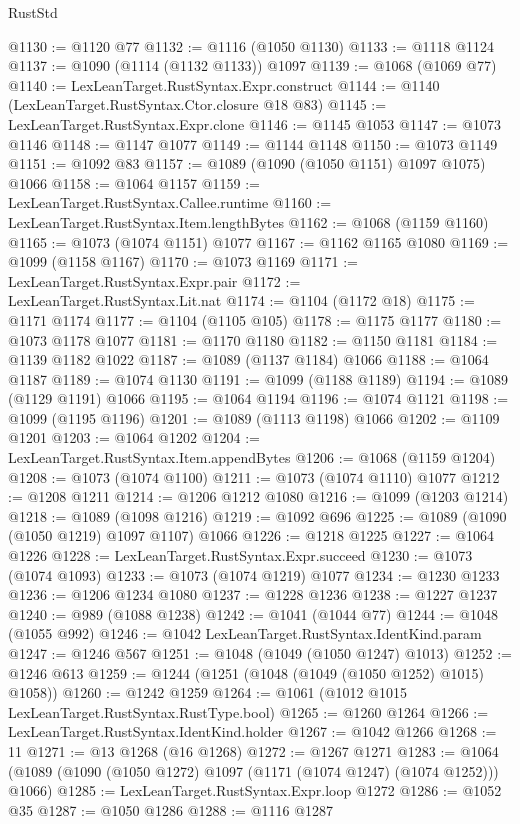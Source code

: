 \begin{lexlean}{RustStd}
\begin{coremodule}
{\begin{coremodule}
{{{{{{{{{{{{{{@1130 := @1120 @77
@1132 := @1116 (@1050 @1130)
@1133 := @1118 @1124
@1137 := @1090 (@1114 (@1132 @1133)) @1097
@1139 := @1068 (@1069 @77)
@1140 := LexLeanTarget.RustSyntax.Expr.construct
@1144 := @1140 (LexLeanTarget.RustSyntax.Ctor.closure @18 @83)
@1145 := LexLeanTarget.RustSyntax.Expr.clone
@1146 := @1145 @1053
@1147 := @1073 @1146
@1148 := @1147 @1077
@1149 := @1144 @1148
@1150 := @1073 @1149
@1151 := @1092 @83
@1157 := @1089 (@1090 (@1050 @1151) @1097 @1075) @1066
@1158 := @1064 @1157
@1159 := LexLeanTarget.RustSyntax.Callee.runtime
@1160 := LexLeanTarget.RustSyntax.Item.lengthBytes
@1162 := @1068 (@1159 @1160)
@1165 := @1073 (@1074 @1151) @1077
@1167 := @1162 @1165 @1080
@1169 := @1099 (@1158 @1167)
@1170 := @1073 @1169
@1171 := LexLeanTarget.RustSyntax.Expr.pair
@1172 := LexLeanTarget.RustSyntax.Lit.nat
@1174 := @1104 (@1172 @18)
@1175 := @1171 @1174
@1177 := @1104 (@1105 @105)
@1178 := @1175 @1177
@1180 := @1073 @1178 @1077
@1181 := @1170 @1180
@1182 := @1150 @1181
@1184 := @1139 @1182 @1022
@1187 := @1089 (@1137 @1184) @1066
@1188 := @1064 @1187
@1189 := @1074 @1130
@1191 := @1099 (@1188 @1189)
@1194 := @1089 (@1129 @1191) @1066
@1195 := @1064 @1194
@1196 := @1074 @1121
@1198 := @1099 (@1195 @1196)
@1201 := @1089 (@1113 @1198) @1066
@1202 := @1109 @1201
@1203 := @1064 @1202
@1204 := LexLeanTarget.RustSyntax.Item.appendBytes
@1206 := @1068 (@1159 @1204)
@1208 := @1073 (@1074 @1100)
@1211 := @1073 (@1074 @1110) @1077
@1212 := @1208 @1211
@1214 := @1206 @1212 @1080
@1216 := @1099 (@1203 @1214)
@1218 := @1089 (@1098 @1216)
@1219 := @1092 @696
@1225 := @1089 (@1090 (@1050 @1219) @1097 @1107) @1066
@1226 := @1218 @1225
@1227 := @1064 @1226
@1228 := LexLeanTarget.RustSyntax.Expr.succeed
@1230 := @1073 (@1074 @1093)
@1233 := @1073 (@1074 @1219) @1077
@1234 := @1230 @1233
@1236 := @1206 @1234 @1080
@1237 := @1228 @1236
@1238 := @1227 @1237
@1240 := @989 (@1088 @1238)
@1242 := @1041 (@1044 @77)
@1244 := @1048 (@1055 @992)
@1246 := @1042 LexLeanTarget.RustSyntax.IdentKind.param
@1247 := @1246 @567
@1251 := @1048 (@1049 (@1050 @1247) @1013)
@1252 := @1246 @613
@1259 := @1244 (@1251 (@1048 (@1049 (@1050 @1252) @1015) @1058))
@1260 := @1242 @1259
@1264 := @1061 (@1012 @1015 LexLeanTarget.RustSyntax.RustType.bool)
@1265 := @1260 @1264
@1266 := LexLeanTarget.RustSyntax.IdentKind.holder
@1267 := @1042 @1266
@1268 := 11
@1271 := @13 @1268 (@16 @1268)
@1272 := @1267 @1271
@1283 := @1064 (@1089 (@1090 (@1050 @1272) @1097 (@1171 (@1074 @1247) (@1074 @1252))) @1066)
@1285 := LexLeanTarget.RustSyntax.Expr.loop @1272
@1286 := @1052 @35
@1287 := @1050 @1286
@1288 := @1116 @1287
}}}}}}}}}}}}}}
\end{coremodule}}
\end{coremodule}
\end{lexlean}
